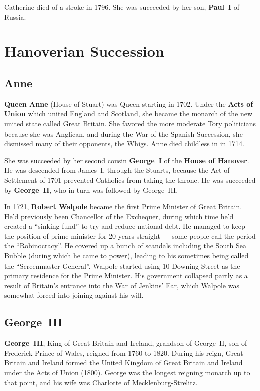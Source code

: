 Catherine died of a stroke in 1796.
She was succeeded by her son, \textbf{Paul~I} of Russia.

\section{Hanoverian Succession}

\subsection*{Anne}

\textbf{Queen Anne} (House of Stuart) was Queen starting in 1702.
Under the \textbf{Acts of Union} which united England and Scotland,
she became the monarch of the new united state called Great Britain.
She favored the more moderate Tory politicians because she was Anglican,
and during the War of the Spanish Succession, she dismissed many of their opponents, the Whigs.
Anne died childless in in 1714.

She was succeeded by her second cousin \textbf{George~I} of the \textbf{House of Hanover}.
He was descended from James~I, through the Stuarts,
because the Act of Settlement of 1701 prevented Catholics from taking the throne.
He was succeeded by \textbf{George~II}, who in turn was followed by George~III\@.

In 1721, \textbf{Robert Walpole} became the first Prime Minister of Great Britain.
He'd previously been Chancellor of the Exchequer,
during which time he'd created a ``sinking fund'' to try and reduce national debt.
He managed to keep the position of prime minister for 20 years straight ---
some people call the period the ``Robinocracy''.
He covered up a bunch of scandals including the South Sea Bubble (during which he came to power),
leading to his sometimes being called the ``Screenmaster General''.
Walpole started using 10 Downing Street as the primary residence for the Prime Minister.
His government collapsed partly as a result of Britain's entrance into the War of Jenkins' Ear,
which Walpole was somewhat forced into joining against his will.

\subsection*{George~III}

\textbf{George~III}, King of Great Britain and Ireland, grandson of George~II, son of Frederick Prince of Wales,
reigned from 1760 to 1820.
During his reign, Great Britain and Ireland formed the United Kingdom of Great Britain and Ireland
under the Acts of Union (1800).
George was the longest reigning monarch up to that point,
and his wife was Charlotte of Mecklenburg-Strelitz.

